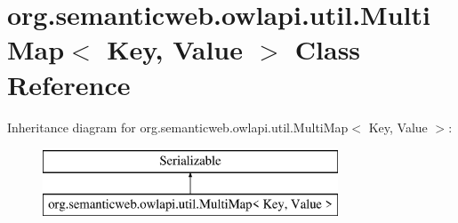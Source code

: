 \hypertarget{classorg_1_1semanticweb_1_1owlapi_1_1util_1_1_multi_map_3_01_key_00_01_value_01_4}{\section{org.\-semanticweb.\-owlapi.\-util.\-Multi\-Map$<$ Key, Value $>$ Class Reference}
\label{classorg_1_1semanticweb_1_1owlapi_1_1util_1_1_multi_map_3_01_key_00_01_value_01_4}
}
Inheritance diagram for org.\-semanticweb.\-owlapi.\-util.\-Multi\-Map$<$ Key, Value $>$\-:\begin{figure}[H]
\begin{center}
\leavevmode
\includegraphics[height=2.000000cm]{classorg_1_1semanticweb_1_1owlapi_1_1util_1_1_multi_map_3_01_key_00_01_value_01_4}
\end{center}
\end{figure}
